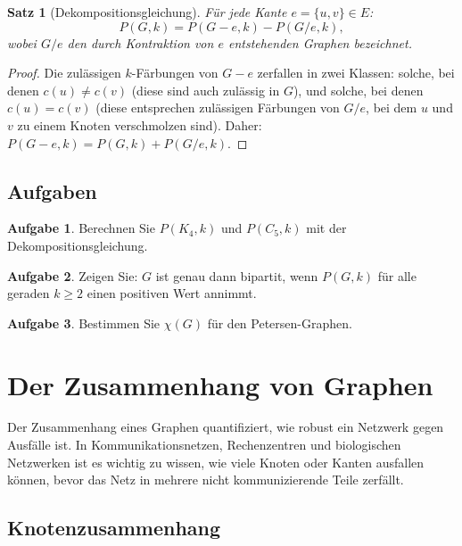 ﻿\documentclass[a4paper,12pt,openany,oneside]{book}
\theoremstyle{definition}
\newtheorem{aufgabe}{Aufgabe}[chapter]
\theoremstyle{plain}
\newtheorem{satz}{Satz}[chapter]
\theoremstyle{remark}
\begin{document}
\begin{satz}[Dekompositionsgleichung]
  F\"ur jede Kante $e = \{u,v\} \in E$:
  \[
    P(G, k) = P(G - e, k) - P(G / e, k),
  \]
  wobei $G/e$ den durch Kontraktion von $e$ entstehenden Graphen bezeichnet.
\end{satz}

\begin{proof}
  Die zul\"assigen $k$-F\"arbungen von $G - e$ zerfallen in zwei Klassen:
  solche, bei denen $c(u) \neq c(v)$ (diese sind auch zul\"assig in $G$),
  und solche, bei denen $c(u) = c(v)$ (diese entsprechen zul\"assigen
  F\"arbungen von $G/e$, bei dem $u$ und $v$ zu einem Knoten verschmolzen
  sind). Daher: $P(G-e, k) = P(G, k) + P(G/e, k)$.
\end{proof}

\section{Aufgaben}

\begin{aufgabe}
  Berechnen Sie $P(K_4, k)$ und $P(C_5, k)$ mit der Dekompositionsgleichung.
\end{aufgabe}

\begin{aufgabe}
  Zeigen Sie: $G$ ist genau dann bipartit, wenn $P(G,k)$ f\"ur alle
  geraden $k \geq 2$ einen positiven Wert annimmt.
\end{aufgabe}

\begin{aufgabe}
  Bestimmen Sie $\chi(G)$ f\"ur den Petersen-Graphen.
\end{aufgabe}

\chapter{Der Zusammenhang von Graphen}

Der Zusammenhang eines Graphen quantifiziert, wie robust ein Netzwerk gegen
Ausfälle ist. In Kommunikationsnetzen, Rechenzentren und biologischen
Netzwerken ist es wichtig zu wissen, wie viele Knoten oder Kanten
ausfallen k\"onnen, bevor das Netz in mehrere nicht kommunizierende Teile
zerf\"allt.

\section{Knotenzusammenhang}
\end{document}
